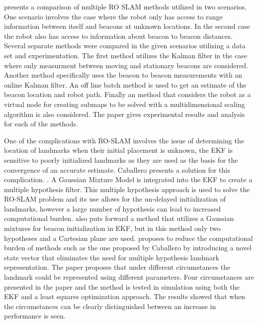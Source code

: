 \documentclass[conference]{IEEEtran}
\begin{document}
\cite{Djugash2006} presents a comparison of multiple RO SLAM methods utilized in two scenarios. One scenario involves the case where the robot only has access to range information between itself and beacons at unknown locations. In the second case the robot also has access to information about beacon to beacon distances. Several separate methods were compared in the given scenarios utilizing a data set and experimentation. The first method utilizes the Kalman filter in the case where only measurment between moving and stationary beacons are considered. Another method specifically uses the beacon to beacon measurements with an online Kalman filter. An off line batch method is used to get an estimate of the beacon location and robot path. Finally an method that considers the robot as a virtual node for creating submaps to be solved with a multidimensional scaling algorithm is also considered. The paper gives experimental results and analysis for each of the methods. 







One of the complications with RO-SLAM involves the issue of determining the location of landmarks when their initial placement is unknown, the EKF is sensitive to poorly initialized landmarks as they are used as the basis for the convergence of an accurate estimate. Caballero presents a solution for this complication. \cite{Caballero2010}. A Gaussian Mixture Model is integrated into the EKF to create a multiple hypothesis filter.  This multiple hypothesis approach is used to solve the RO-SLAM problem and its use allows for the un-delayed initialization of landmarks, however a large number of hypothesis can lead to increased computational burden. \cite{Geneve2015} also puts forward a method that utilizes a Gaussian mixtures for beacon initialization in EKF, but in this method only two hypotheses and a Cartesian plane are used.   \cite{Ahmad2011a} proposes to reduce the computational burden of methods such as the one proposed by Caballero \cite{Caballero2010} by introducing a novel state vector that eliminates the need for multiple hypothesis landmark representation. The paper proposes that under different circumstances the landmark could be represented using different parameters. Four circumstances are presented in the paper and the method is tested in simulation using both the EKF and a least squares optimization approach. The results showed that when the circumstances can be clearly distinguished between an increase in performance is seen.
\end{document}
